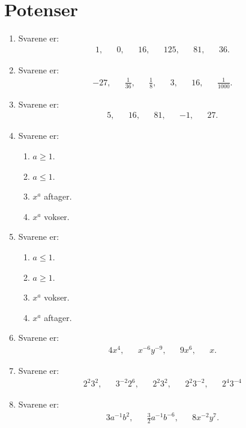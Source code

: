 \newpage
\section{Potenser}
\begin{enumerate}
\item Svarene er:
\begin{align*}
1,&&0,&& 16,&&125,&& 81,&& 36.
\end{align*}
\item Svarene er:
\begin{align*}
-27,&& \frac{1}{36},&& \frac{1}{8},&& 3,&& 16,&& \frac{1}{1000}.
\end{align*}
\item Svarene er:
\begin{align*}
5,&& 16,&& 81,&& -1,&&27.
\end{align*}
\item Svarene er:
\begin{enumerate}
\item $a\geq 1$.
\item $a\leq 1$.
\item $x^a$ aftager.
\item $x^a$ vokser.
\end{enumerate}
\item Svarene er:
\begin{enumerate}
\item $a\leq 1$.
\item $a\geq 1$.
\item $x^a$ vokser.
\item $x^a$ aftager.
\end{enumerate}
 
\item Svarene er:
\begin{align*}
4x^4,&& x^{-6}y^{-9},&& 9x^6,&& x.
\end{align*}
\item Svarene er:
\begin{align*}
2^2 3^2,&& 3^{-2}2^6,&& 2^2 3^2,&& 2^2 3^{-2},&& 2^4 3^{-4}
\end{align*}
\item Svarene er:
\begin{align*}
3a^{-1}b^2,&&\frac{3}{2}a^{-1}b^{-6},&& 8x^{-2}y^7.
\end{align*}


\end{enumerate}
